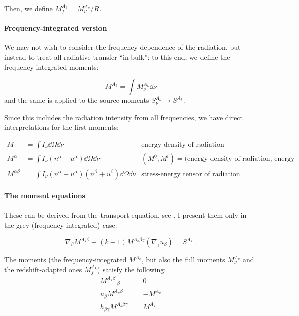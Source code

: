 \documentclass[main.tex]{subfiles}
\begin{document}
Then, we define \( M_f ^{A_k} =  M_{\nu} ^{A_k} / R\).

\paragraph{Frequency-integrated version}

We may not wish to consider the frequency dependence of the radiation, but instead to treat all radiative transfer ``in bulk'': to this end, we define the frequency-integrated moments:

\begin{equation}
   M ^{A_k} = \int M^{A_k} _\nu \dd{\nu}
\end{equation}
and the same is applied to the source moments \(S_\nu^{A_k} \rightarrow S^{A_k}\).

Since this includes the radiation intensity from all frequencies, we have direct interpretations for the first moments:

\begin{subequations}
\begin{align}
   M &= \int  I_\nu \dd{\Omega} \dd{\nu}   & \text{energy density of radiation}  \\
   M^\alpha &= \int I_\nu (n^\alpha + u^\alpha)\dd{\Omega} \dd{\nu}   & (M^0, M^i) = \text{(energy density of radiation, energy flux)}  \\
   M^{\alpha\beta} &= \int I_\nu (n^\alpha + u^\alpha)(n^\beta + u^\beta)\dd{\Omega} \dd{\nu}   & \text{stress-energy tensor of radiation.}
\end{align}
\end{subequations}

\paragraph{The moment equations}

These can be derived from the transport equation, see \textcite[eq. 3.14]{Thorne:1981feb}. I present them only in the grey (frequency-integrated) case:

\begin{equation} \label{eq:grey-moment-equations}
  \nabla_\beta M^{A_k \beta} - (k-1) M^{A_k \beta \gamma} (\nabla_ \gamma u_\beta)= S^{A_k} \,.
\end{equation}

The moments (the frequency-integrated \(M^{A_k}\), but also the full moments \(M^{A_k}_\nu\) and the redshift-adapted ones \(M^{A_k}_f\)) satisfy the following:
\begin{subequations}
\begin{align}
  M^{A_k \beta}\,_\beta &= 0 \\
  u_\beta M^{A_k \beta} &= -M^{A_k} \\
  h_{\beta \gamma} M^{A_k \beta \gamma} &= M^{A_k} \,.
\end{align}
\end{subequations}
\end{document}
